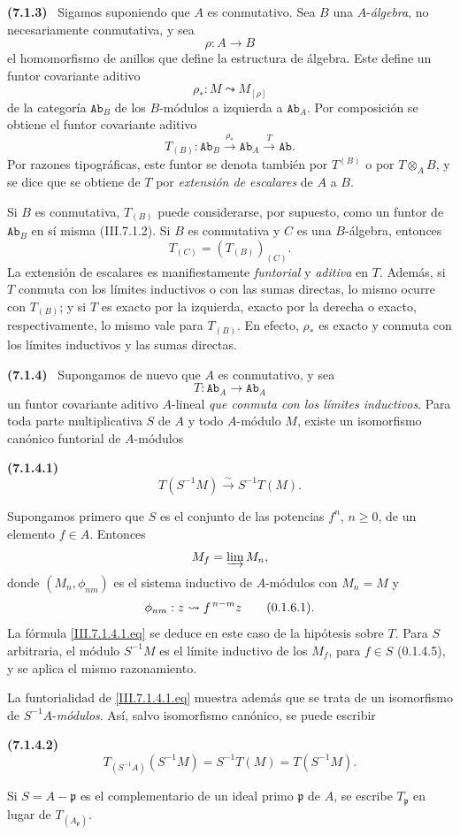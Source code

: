 \documentclass[10pt,oneside]{book}
\newcommand{\cat}[1]{\mathtt{#1}}
\newcommand{\vphi}{\phi}
\newcommand{\sref}[2][]{\textup{(#2)}}
\newcommand{\oldpage}[2][]{\setcounter{footnote}{0}\marginpar{\scriptsize\textbf{#1}~|~#2}\ignorespaces}
\newenvironment{env}[1][]{\par\medskip\noindent\textbf{(#1)}\ }{\par}
\providecommand{\setmin}{-}%
\begin{document}
\begin{env}[7.1.3]
\label{III.7.1.3}
Sigamos suponiendo que $A$ es conmutativo. Sea $B$ una
$A$-\emph{álgebra}, no necesariamente conmutativa, y sea
\[
  \rho:A\longrightarrow B
\]
el homomorfismo de anillos que define la estructura de álgebra.
Este define un
\oldpage[III]{176}
funtor covariante aditivo
\[
  \rho_*:M\leadsto M_{[\rho]}
\]
de la categoría $\cat{Ab}_B$ de los $B$-módulos a izquierda a
$\cat{Ab}_A$. Por composición se obtiene el funtor covariante
aditivo
\[
  T_{(B)}:
  \cat{Ab}_B
  \xrightarrow{\rho_*}
  \cat{Ab}_A
  \xrightarrow{T}
  \cat{Ab}.
\]
Por razones tipográficas, este funtor se denota también por
$T^{(B)}$ o por $T\otimes_AB$, y se dice que se obtiene de $T$ por
\emph{extensión de escalares} de $A$ a $B$.

Si $B$ es conmutativa, $T_{(B)}$ puede considerarse, por supuesto,
como un funtor de $\cat{Ab}_B$ en sí misma
\sref{III.7.1.2}. Si $B$ es conmutativa y $C$ es una $B$-álgebra,
entonces
\[
  T_{(C)}=(T_{(B)})_{(C)}.
\]
La extensión de escalares es manifiestamente \emph{funtorial} y \emph{aditiva}
en $T$. Además, si $T$ conmuta con los límites inductivos o con las
sumas directas, lo mismo ocurre con $T_{(B)}$; y si $T$ es exacto
por la izquierda, exacto por la derecha o exacto,
respectivamente, lo mismo vale para $T_{(B)}$. En efecto,
$\rho_*$ es exacto y conmuta con los límites inductivos y las sumas
directas.
\end{env}

\begin{env}[7.1.4]
\label{III.7.1.4}
Supongamos de nuevo que $A$ es conmutativo, y sea
\[
  T:\cat{Ab}_A\longrightarrow\cat{Ab}_A
\]
un funtor covariante aditivo $A$-lineal \emph{que conmuta con los
límites inductivos}. Para toda parte multiplicativa $S$ de $A$ y
todo $A$-módulo $M$, existe un isomorfismo canónico funtorial de
$A$-módulos
\begin{env}[7.1.4.1]
\label{III.7.1.4.1}
\[
  T(S^{-1}M)
  \xrightarrow{\sim}
  S^{-1}T(M).
  \tag{7.1.4.1}\label{III.7.1.4.1.eq}
\]
\end{env}

Supongamos primero que $S$ es el conjunto de las potencias $f^n$,
$n\geq0$, de un elemento $f\in A$. Entonces
\[
  M_f=\varinjlim M_n,
\]
donde $(M_n,\vphi_{nm})$ es el sistema inductivo de $A$-módulos
con $M_n=M$ y
\[
  \vphi_{nm}:z\leadsto f^{\,n-m}z
  \qquad\text{\sref[0]{0.1.6.1}}.
\]
La fórmula \eqref{III.7.1.4.1.eq} se deduce en este caso de la
hipótesis sobre $T$. Para $S$ arbitraria, el módulo $S^{-1}M$ es
el límite inductivo de los $M_f$, para $f\in S$
\sref[0]{0.1.4.5}, y se aplica el mismo razonamiento.

La funtorialidad de \eqref{III.7.1.4.1.eq} muestra además que se
trata de un isomorfismo de $S^{-1}A$-\emph{módulos}. Así, salvo
isomorfismo canónico, se puede escribir
\begin{env}[7.1.4.2]
\label{III.7.1.4.2}
\[
  T_{(S^{-1}A)}(S^{-1}M)
  =
  S^{-1}T(M)
  =
  T(S^{-1}M).
  \tag{7.1.4.2}\label{III.7.1.4.2.eq}
\]
\end{env}
Si $S=A\setmin\mathfrak p$ es el complementario de un ideal primo
$\mathfrak p$ de $A$, se escribe $T_{\mathfrak p}$ en lugar de
$T_{(A_{\mathfrak p})}$.
\end{env}
\end{document}
